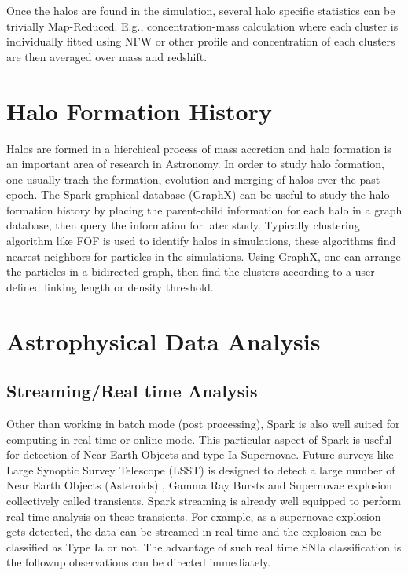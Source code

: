 \documentclass[twocolumn, prd]{revtex4}
\begin{document}
Once the halos are found in the simulation, several halo specific statistics can be trivially Map-Reduced. E.g., concentration-mass calculation where each cluster is individually fitted using NFW or other profile and concentration of each clusters are then averaged over mass and redshift. 

\section{Halo Formation History}
Halos are formed in a hierchical process of mass accretion and halo formation is an important area of research in Astronomy. In order to study halo formation, one usually trach the formation, evolution and merging of halos over the past epoch. The Spark graphical database (GraphX) can be useful to study the halo formation history by placing the parent-child information for each halo in a graph database, then query the information for later study. Typically clustering algorithm like FOF is used to identify halos in simulations, these algorithms find nearest neighbors for particles in the simulations. Using GraphX, one can arrange the particles in a bidirected graph, then find the clusters according to a user defined linking length or density threshold. 


\section{Astrophysical Data Analysis}
\subsection{Streaming/Real time Analysis}
Other than working in batch mode (post processing), Spark is also well suited for computing in real time or online mode. This particular aspect of Spark is useful for detection of Near Earth Objects and type Ia Supernovae. Future surveys like Large Synoptic Survey Telescope (LSST) is designed to detect a large number of Near Earth Objects (Asteroids) , Gamma Ray Bursts and Supernovae explosion collectively called transients. Spark streaming is already well equipped to perform real time analysis on these transients. For example, as a supernovae explosion gets detected, the data can be streamed in real time and the explosion can be classified as Type Ia or not. The advantage of such real time SNIa classification is the followup observations can be directed immediately.  
\end{document}
